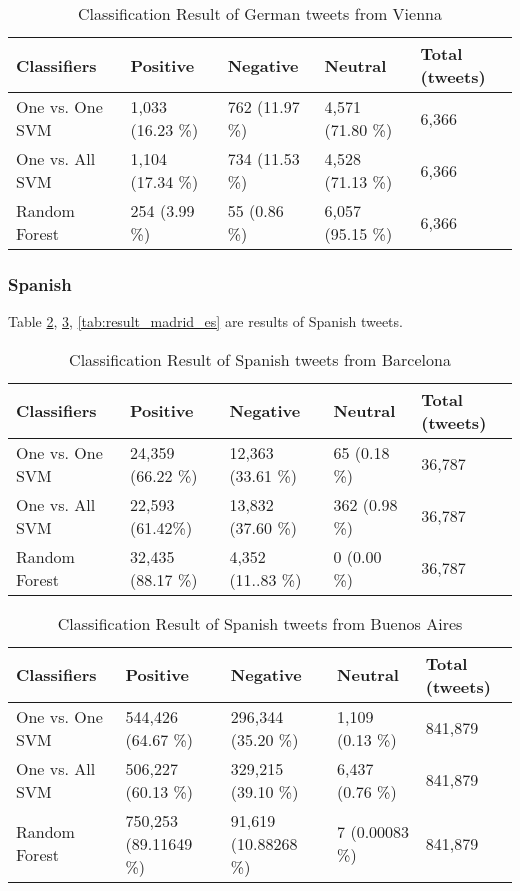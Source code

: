 \begin{table}[ht]
	\caption{Classification Result of German tweets from Vienna}
	\begin{tabular}{|l|p{1.8cm}|p{1.8cm}|p{1.8cm}|p{1.8cm}|} \hline
	Classifiers & Positive & Negative & Neutral & Total (tweets)\\ \hline
	
	One vs. One SVM & 1,033 (16.23 \%)& 762 (11.97 \%)& 4,571 (71.80 \%)& 6,366 \\ \hline
	One vs. All SVM & 1,104 (17.34 \%)& 734 (11.53 \%)& 4,528 (71.13 \%)& 6,366 \\ \hline
	Random Forest   & 254 (3.99 \%) & 55 (0.86 \%) & 6,057 (95.15 \%)& 6,366 \\ \hline
	\end{tabular}
	\label{tab:result_vienna_de}
\end{table}

\begin{comment}
London
N.Y or San Francisco

\end{comment}

\clearpage
\subsubsection{Spanish}
Table \ref{tab:result_barcelona_es}, \ref{tab:result_buenosaires_es}, \ref{tab:result_madrid_es} are results of Spanish tweets.
\begin{table}[ht]
	\caption{Classification Result of Spanish tweets from Barcelona}
	\begin{tabular}{|l|p{1.8cm}|p{1.8cm}|p{1.8cm}|p{1.8cm}|} \hline
	Classifiers & Positive & Negative & Neutral & Total (tweets)\\ \hline
One vs. One SVM & 24,359 (66.22 \%)& 12,363 (33.61 \%)& 65 (0.18 \%) & 36,787\\ \hline
One vs. All SVM & 22,593 (61.42\%) & 13,832 (37.60 \%)& 362 (0.98 \%)& 36,787\\ \hline
Random Forest   & 32,435 (88.17 \%) & 4,352 (11..83 \%) & 0  (0.00 \%)& 36,787 \\ \hline
	\end{tabular}
	\label{tab:result_barcelona_es}
\end{table}


\begin{table}[ht]
	\caption{Classification Result of Spanish tweets from Buenos Aires}
	\begin{tabular}{|l|p{1.8cm}|p{1.8cm}|p{1.8cm}|p{1.8cm}|} \hline
	Classifiers & Positive & Negative & Neutral & Total (tweets)\\ \hline
One vs. One SVM & 544,426 (64.67 \%)& 296,344 (35.20 \%)& 1,109 (0.13 \%)& 841,879 \\ \hline
One vs. All SVM & 506,227 (60.13 \%)& 329,215 (39.10 \%)& 6,437 (0.76 \%)& 841,879 \\ \hline
Random Forest   & 750,253 (89.11649 \%)& 91,619 (10.88268 \%) & 7 (0.00083 \%) & 841,879 \\ \hline
	\end{tabular}
	\label{tab:result_buenosaires_es}
\end{table}

